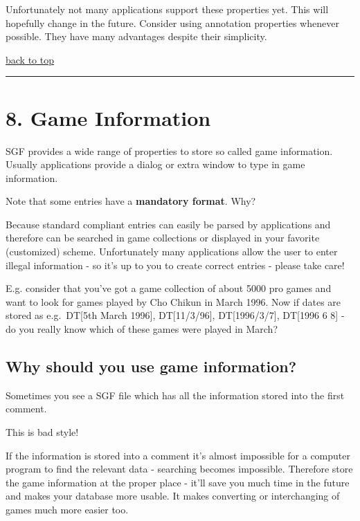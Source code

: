 Unfortunately not many applications support these properties yet. This
will hopefully change in the future. Consider using annotation
properties whenever possible. They have many advantages despite their
simplicity.

\href{https://red-bean.com/sgf/user_guide/index.html\#toc}{back to top}

\begin{center}\rule{0.5\linewidth}{0.5pt}\end{center}

\section{8. Game Information}\label{game-information}

SGF provides a wide range of properties to store so called game
information. Usually applications provide a dialog or extra window to
type in game information.

Note that some entries have a \textbf{mandatory format}. Why?

Because standard compliant entries can easily be parsed by applications
and therefore can be searched in game collections or displayed in your
favorite (customized) scheme. Unfortunately many applications allow the
user to enter illegal information - so it's up to you to create correct
entries - please take care!

E.g. consider that you've got a game collection of about 5000 pro games
and want to look for games played by Cho Chikun in March 1996. Now if
dates are stored as e.g.~DT{[}5th March 1996{]}, DT{[}11/3/96{]},
DT{[}1996/3/7{]}, DT{[}1996 6 8{]} - do you really know which of these
games were played in March?

\subsection{Why should you use game
information?}\label{why-should-you-use-game-information}

Sometimes you see a SGF file which has all the information stored into
the first comment.

This is bad style!

If the information is stored into a comment it's almost impossible for a
computer program to find the relevant data - searching becomes
impossible. Therefore store the game information at the proper place -
it'll save you much time in the future and makes your database more
usable. It makes converting or interchanging of games much more easier
too.

